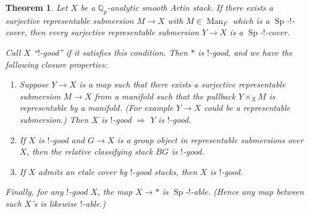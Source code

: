 \documentclass[12pt]{article}
\newtheorem{theorem}{Theorem}[section]
\newcommand{\on}{\operatorname}
\newcommand{\mbb}{\mathbb}
\begin{document}
\begin{theorem}\label{good}
Let $X$ be a $\mbb{Q}_p$-analytic smooth Artin stack. If there exists a surjective representable submersion $M\to X$ with $M\in\on{Man}_F$ which is a $\on{Sp}$-$!$-cover, then every surjective representable submersion $Y\to X$ is a $\on{Sp}$-$!$-cover.

Call $X$ ``$!$-good'' if it satisfies this condition.  Then $\ast$ is $!$-good, and we have the following closure properties:
\begin{enumerate}
\item Suppose $Y\to X$ is a map such that there exists a surjective representable submersion $M\to X$ from a manifold such that the pullback $Y\times_XM$ is representable by a manifold. (For example $Y\to X$ could be a representable submersion.) Then $X$ is $!$-good $\Rightarrow$ $Y$ is $!$-good.
\item If $X$ is $!$-good and $G\to X$ is a group object in representable submersions over $X$, then the relative classifying stack $BG$ is $!$-good.
\item If $X$ admits an etale cover by $!$-good stacks, then $X$ is $!$-good.
\end{enumerate}
Finally, for any $!$-good $X$, the map $X\to \ast$ is $\on{Sp}$-$!$-able. (Hence any map between such $X$'s is likewise $!$-able.)
\end{theorem}
\end{document}

